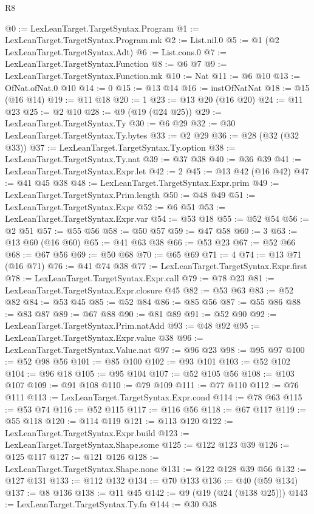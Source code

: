 \begin{lexlean}{R8}
\begin{coremodule}
@0 := LexLeanTarget.TargetSyntax.Program
@1 := LexLeanTarget.TargetSyntax.Program.mk
@2 := List.nil.{0}
@5 := @1 (@2 LexLeanTarget.TargetSyntax.Adt)
@6 := List.cons.{0}
@7 := LexLeanTarget.TargetSyntax.Function
@8 := @6 @7
@9 := LexLeanTarget.TargetSyntax.Function.mk
@10 := Nat
@11 := @6 @10
@13 := OfNat.ofNat.{0} @10
@14 := 0
@15 := @13 @14
@16 := instOfNatNat
@18 := @15 (@16 @14)
@19 := @11 @18
@20 := 1
@23 := @13 @20 (@16 @20)
@24 := @11 @23
@25 := @2 @10
@28 := @9 (@19 (@24 @25))
@29 := LexLeanTarget.TargetSyntax.Ty
@30 := @6 @29
@32 := @30 LexLeanTarget.TargetSyntax.Ty.bytes
@33 := @2 @29
@36 := @28 (@32 (@32 @33))
@37 := LexLeanTarget.TargetSyntax.Ty.option
@38 := LexLeanTarget.TargetSyntax.Ty.nat
@39 := @37 @38
@40 := @36 @39
@41 := LexLeanTarget.TargetSyntax.Expr.let
@42 := 2
@45 := @13 @42 (@16 @42)
@47 := @41 @45 @38
@48 := LexLeanTarget.TargetSyntax.Expr.prim
@49 := LexLeanTarget.TargetSyntax.Prim.length
@50 := @48 @49
@51 := LexLeanTarget.TargetSyntax.Expr
@52 := @6 @51
@53 := LexLeanTarget.TargetSyntax.Expr.var
@54 := @53 @18
@55 := @52 @54
@56 := @2 @51
@57 := @55 @56
@58 := @50 @57
@59 := @47 @58
@60 := 3
@63 := @13 @60 (@16 @60)
@65 := @41 @63 @38
@66 := @53 @23
@67 := @52 @66
@68 := @67 @56
@69 := @50 @68
@70 := @65 @69
@71 := 4
@74 := @13 @71 (@16 @71)
@76 := @41 @74 @38
@77 := LexLeanTarget.TargetSyntax.Expr.first
@78 := LexLeanTarget.TargetSyntax.Expr.call
@79 := @78 @23
@81 := LexLeanTarget.TargetSyntax.Expr.closure @45
@82 := @53 @63
@83 := @52 @82
@84 := @53 @45
@85 := @52 @84
@86 := @85 @56
@87 := @55 @86
@88 := @83 @87
@89 := @67 @88
@90 := @81 @89
@91 := @52 @90
@92 := LexLeanTarget.TargetSyntax.Prim.natAdd
@93 := @48 @92
@95 := LexLeanTarget.TargetSyntax.Expr.value @38
@96 := LexLeanTarget.TargetSyntax.Value.nat
@97 := @96 @23
@98 := @95 @97
@100 := @52 @98 @56
@101 := @85 @100
@102 := @93 @101
@103 := @52 @102
@104 := @96 @18
@105 := @95 @104
@107 := @52 @105 @56
@108 := @103 @107
@109 := @91 @108
@110 := @79 @109
@111 := @77 @110
@112 := @76 @111
@113 := LexLeanTarget.TargetSyntax.Expr.cond
@114 := @78 @63
@115 := @53 @74
@116 := @52 @115
@117 := @116 @56
@118 := @67 @117
@119 := @55 @118
@120 := @114 @119
@121 := @113 @120
@122 := LexLeanTarget.TargetSyntax.Expr.build
@123 := LexLeanTarget.TargetSyntax.Shape.some
@125 := @122 @123 @39
@126 := @125 @117
@127 := @121 @126
@128 := LexLeanTarget.TargetSyntax.Shape.none
@131 := @122 @128 @39 @56
@132 := @127 @131
@133 := @112 @132
@134 := @70 @133
@136 := @40 (@59 @134)
@137 := @8 @136
@138 := @11 @45
@142 := @9 (@19 (@24 (@138 @25)))
@143 := LexLeanTarget.TargetSyntax.Ty.fn
@144 := @30 @38

\end{coremodule}
\end{lexlean}
